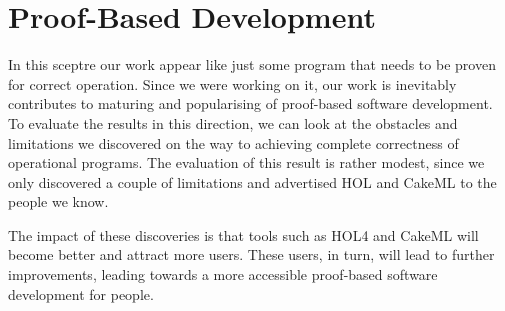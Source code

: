 \section{Proof-Based Development}
In this sceptre our work appear like just some program that needs to be proven for correct operation. Since we were working on it, our work is inevitably contributes to maturing and popularising of proof-based software development. 
To evaluate the results in this direction, we can look at the obstacles and limitations we discovered on the way to achieving complete correctness of operational programs. The evaluation of this result is rather modest, since we only discovered a couple of limitations and advertised HOL and CakeML to the people we know. 

The impact of these discoveries is that tools such as HOL4 and CakeML will become better and attract more users. These users, in turn, will lead to further improvements, leading towards a more accessible proof-based software development for people.



















